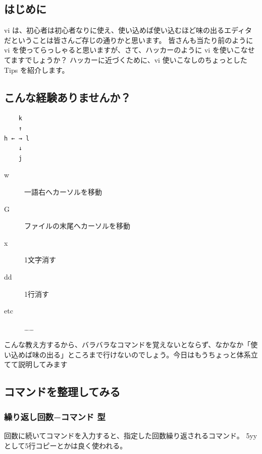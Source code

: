\documentclass[mingoth,a4paper]{jsarticle}
\begin{document}
\subsection{はじめに}

vi は、初心者は初心者なりに使え、使い込めば使い込むほど味の出るエディタだということは皆さんご存じの通りかと思います。
皆さんも当たり前のように vi を使ってらっしゃると思いますが、さて、ハッカーのように vi を使いこなせてますでしょうか？
ハッカーに近づくために、vi 使いこなしのちょっとした Tips を紹介します。

\subsection{こんな経験ありませんか？}

\begin{verbatim}
    k
    ↑
h ← → l
    ↓
    j
\end{verbatim}

\begin{description}
  \item[w] 一語右へカーソルを移動
  \item[G] ファイルの末尾へカーソルを移動
  \item[x] 1文字消す
  \item[dd] 1行消す
  \item[etc] ……
\end{description}

こんな教え方するから、バラバラなコマンドを覚えないとならず、なかなか「使い込めば味の出る」ところまで行けないのでしょう。今日はもうちょっと体系立てて説明してみます

\subsection{コマンドを整理してみる}

\subsubsection{繰り返し回数−コマンド 型}

回数に続いてコマンドを入力すると、指定した回数繰り返されるコマンド。
5yy として5行コピーとかは良く使われる。
\end{document}
